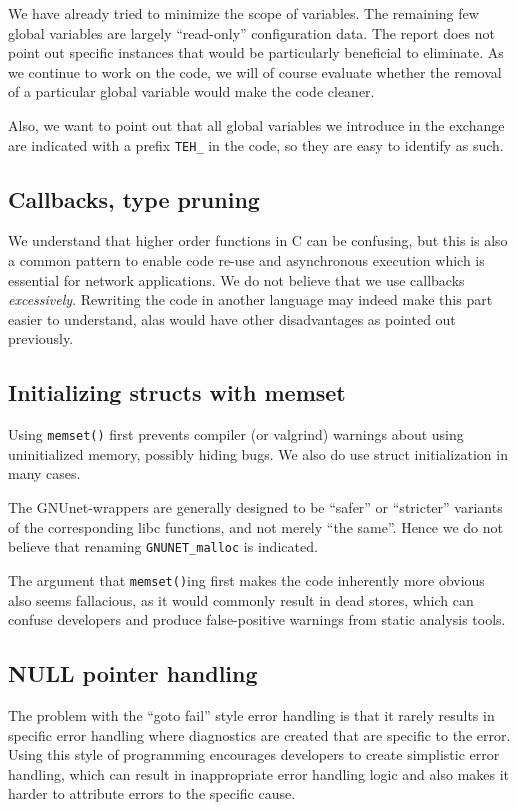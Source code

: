 \documentclass[11pt]{article}
\begin{document}
We have already tried to minimize the scope of variables. The remaining few
global variables are largely ``read-only'' configuration data. The report does
not point out specific instances that would be particularly beneficial to
eliminate. As we continue to work on the code, we will of course evaluate
whether the removal of a particular global variable would make the code
cleaner.

Also, we want to point out that all global variables we introduce
in the exchange are indicated with a prefix {\tt TEH\_} in the code, so they
are easy to identify as such.

\subsection{Callbacks, type pruning}

We understand that higher order functions in C can be confusing, but this
is also a common pattern to enable code re-use and asynchronous execution
which is essential for network applications. We do not believe that we
use callbacks {\em excessively}.  Rewriting the code in another language
may indeed make this part easier to understand, alas would have other
disadvantages as pointed out previously.

\subsection{Initializing structs with memset}

Using {\tt memset()} first prevents compiler (or valgrind) warnings about
using uninitialized memory, possibly hiding bugs. We also do use struct
initialization in many cases.

The GNUnet-wrappers are generally designed to be ``safer'' or ``stricter''
variants of the corresponding libc functions, and not merely ``the same''.
Hence we do not believe that renaming {\tt GNUNET\_malloc} is indicated.

The argument that {\tt memset()}ing first makes the code inherently more
obvious also seems fallacious, as it would commonly result in dead stores,
which can confuse developers and produce false-positive warnings from static
analysis tools.

\subsection{NULL pointer handling}

The problem with the ``goto fail'' style error handling is that it rarely
results in specific error handling where diagnostics are created that are
specific to the error. Using this style of programming encourages developers
to create simplistic error handling, which can result in inappropriate error
handling logic and also makes it harder to attribute errors to the specific
cause.
\end{document}
